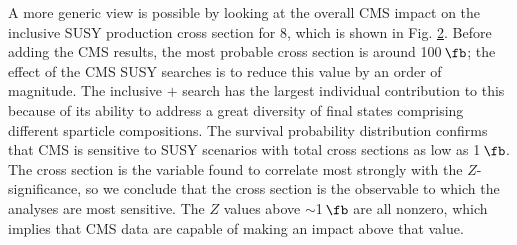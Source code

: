 \begin{figure}[t]
  \vspace{1mm}
  \caption{ }
  \label{fig:mLNDw}
\end{figure}


A more generic view is  possible by looking at the overall CMS impact on the inclusive SUSY production cross section for 8\TeV, which is shown in Fig. \ref{fig:xsect}. 
Before adding the CMS results, the most probable cross section is
around 100\,$\fb$; the effect of the CMS SUSY searches is to reduce this
value by an order of magnitude.  The inclusive \HT{}$+$\MHT{} search
has the largest individual contribution to this because of its ability to address a great diversity of final states comprising different sparticle compositions.  The survival probability distribution confirms that CMS is sensitive to SUSY scenarios with total cross sections as low as 1\,$\fb$.  The cross section is the variable found to correlate most strongly with the
$Z$-significance, so we conclude that the cross section is the observable to which the analyses are most sensitive.  The $Z$ values above $\sim$1\,$\fb$ are all nonzero, which implies that CMS data are capable of making an impact above that value.

\begin{figure}[t]
    \vspace{1mm}
    \caption{}
    \label{fig:xsect}
\end{figure}



